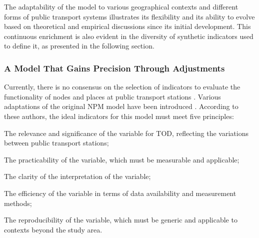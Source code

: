 \begin{refsegment}
The adaptability of the model to various geographical contexts and different forms of public transport systems illustrates its flexibility and its ability to evolve based on theoretical and empirical discussions since its initial development. This continuous enrichment is also evident in the diversity of synthetic indicators used to define it, as presented in the following section.%

\subsubsection*{A Model That Gains Precision Through Adjustments
    \label{chap6:litterature-indicateurs}
    }

Currently, there is no consensus on the selection of indicators to evaluate the functionality of nodes and places at public transport stations \textcolor{blue}{\autocites[446]{chen_node-place_2015}[194]{reusser_classifying_2008}}. Various adaptations of the original \acrshort{NPM} model have been introduced \textcolor{blue}{\autocites[2]{lee_passive_2024}[20]{lukman_development_2014}}. According to these authors, the ideal indicators for this model must meet five principles:
\begin{customitemize}
    \item The relevance and significance of the variable for \acrshort{TOD}, reflecting the variations between public transport stations;
    \item The practicability of the variable, which must be measurable and applicable;
    \item The clarity of the interpretation of the variable;
    \item The efficiency of the variable in terms of data availability and measurement methods;
    \item The reproducibility of the variable, which must be generic and applicable to contexts beyond the study area.
\end{customitemize}%


\end{refsegment}
